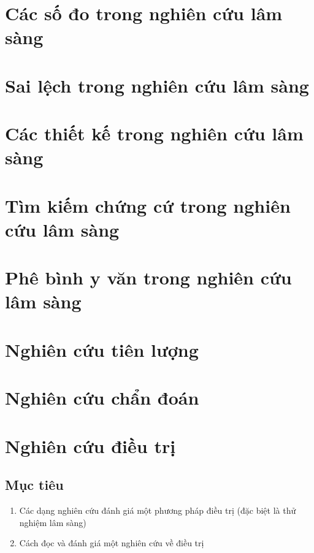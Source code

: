 \documentclass[
]{book}
\begin{document}
\hypertarget{measure}{%
\chapter{Các số đo trong nghiên cứu lâm sàng}\label{measure}}

\hypertarget{bias}{%
\chapter{Sai lệch trong nghiên cứu lâm sàng}\label{bias}}

\hypertarget{design}{%
\chapter{Các thiết kế trong nghiên cứu lâm sàng}\label{design}}

\hypertarget{litsearch}{%
\chapter{Tìm kiếm chứng cứ trong nghiên cứu lâm sàng}\label{litsearch}}

\hypertarget{appraisal}{%
\chapter{Phê bình y văn trong nghiên cứu lâm sàng}\label{appraisal}}

\hypertarget{prognosis}{%
\chapter{Nghiên cứu tiên lượng}\label{prognosis}}

\hypertarget{diagnosis}{%
\chapter{Nghiên cứu chẩn đoán}\label{diagnosis}}

\hypertarget{therapeutic}{%
\chapter{Nghiên cứu điều trị}\label{therapeutic}}

\hypertarget{mux1ee5c-tiuxeau}{%
\section{Mục tiêu}\label{mux1ee5c-tiuxeau}}

\begin{enumerate}
\def\labelenumi{\arabic{enumi}.}
\item
  Các dạng nghiên cứu đánh giá một phương pháp điều trị (đặc biệt là thử nghiệm lâm sàng)
\item
  Cách đọc và đánh giá một nghiên cứu về điều trị
\end{enumerate}
\end{document}
